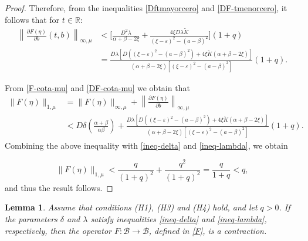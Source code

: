 \documentclass[9pt]{amsart}
\newtheorem{lemma}{Lemma}
\numberwithin{equation}{section}
\numberwithin{lemma}{section}
\begin{document}
\begin{proof}
Therefore, from the inequalities \eqref{Dftmayorcero} and \eqref{DF-tmenorcero}, it follows that for $t\in\mathbb{R}$:
\begin{align}
    \left\|\frac{\partial F(\eta)}{\partial b}(t,b)\right\|_{\infty,\mu}&<\Big[\frac{D^2\lambda}{\alpha+\beta-2\xi}+\frac{4\xi D\lambda\tilde{K}}{(\xi-\varepsilon)^2-(a-\beta)^2}\Big](1+q)\nonumber\\
    &= \frac{D\lambda[D((\xi-\varepsilon)^2-(a-\beta)^2)+4\xi\tilde{K}(\alpha+\beta-2\xi)]}{(\alpha+\beta-2\xi)[(\xi-\varepsilon)^2-(a-\beta)^2]}(1+q).\label{DF-cota-mu}
\end{align}

From \eqref{F-cota-mu} and \eqref{DF-cota-mu} we obtain that
\begin{align*}
    \|F(\eta)\|_{1,\mu} &= \|F(\eta)\|_{\infty,\mu} +  \left\|\frac{\partial F(\eta)}{\partial b}\right\|_{\infty,\mu}\nonumber\\
    &< D\delta\left(\frac{\alpha+\beta}{\alpha\beta}\right) + \frac{D\lambda[D((\xi-\varepsilon)^2-(a-\beta)^2)+4\xi\tilde{K}(\alpha+\beta-2\xi)]}{(\alpha+\beta-2\xi)[(\xi-\varepsilon)^2-(a-\beta)^2]}(1+q).
\end{align*}
Combining the above inequality with \eqref{ineq-delta} and \eqref{ineq-lambda}, we obtain

$$\|F(\eta)\|_{1,\mu}<\frac{q}{(1+q)^2}+\frac{q^2}{(1+q)^2}=\frac{q}{1+q}<q,$$
and thus the result follows.
\end{proof}


    \begin{lemma}\label{lemma:contraction}
Assume that conditions \textnormal{(H1)}, \textnormal{(H3)} and \textnormal{(H4)} hold, and let \(q > 0\). If the parameters \(\delta\) and \(\lambda\) satisfy inequalities \eqref{ineq-delta} and \eqref{ineq-lambda}, respectively, then the operator \(F \colon \mathcal{B} \to \mathcal{B}\), defined in \eqref{F}, is a contraction.
\end{lemma}
\end{document}
